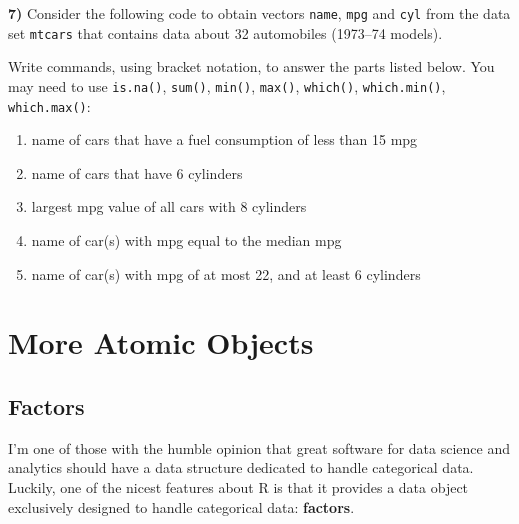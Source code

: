 \documentclass[
]{book}
\newenvironment{Shaded}{\begin{snugshade}}{\end{snugshade}}
\newcommand{\CommentTok}[1]{\textcolor[rgb]{0.56,0.35,0.01}{\textit{#1}}}
\newcommand{\FunctionTok}[1]{\textcolor[rgb]{0.00,0.00,0.00}{#1}}
\newcommand{\NormalTok}[1]{#1}
\newcommand{\OtherTok}[1]{\textcolor[rgb]{0.56,0.35,0.01}{#1}}
\newcommand{\SpecialCharTok}[1]{\textcolor[rgb]{0.00,0.00,0.00}{#1}}
\begin{document}
\textbf{7)} Consider the following code to obtain vectors \texttt{name}, \texttt{mpg} and \texttt{cyl}
from the data set \texttt{mtcars} that contains data about 32 automobiles (1973--74
models).

\begin{Shaded}
\end{Shaded}

Write commands, using bracket notation, to answer the parts listed below.
You may need to use \texttt{is.na()}, \texttt{sum()}, \texttt{min()}, \texttt{max()}, \texttt{which()},
\texttt{which.min()}, \texttt{which.max()}:

\begin{enumerate}
\def\labelenumi{\alph{enumi})}
\item
  name of cars that have a fuel consumption of less than 15 mpg
\item
  name of cars that have 6 cylinders
\item
  largest mpg value of all cars with 8 cylinders
\item
  name of car(s) with mpg equal to the median mpg
\item
  name of car(s) with mpg of at most 22, and at least 6 cylinders
\end{enumerate}

\hypertarget{part-more-atomic-objects}{%
\part{More Atomic Objects}\label{part-more-atomic-objects}}

\hypertarget{factors}{%
\chapter{Factors}\label{factors}}

I'm one of those with the humble opinion that great software for data science
and analytics should have a data structure dedicated to handle categorical data.
Luckily, one of the nicest features about R is that it provides a data
object exclusively designed to handle categorical data: \textbf{factors}.
\end{document}
